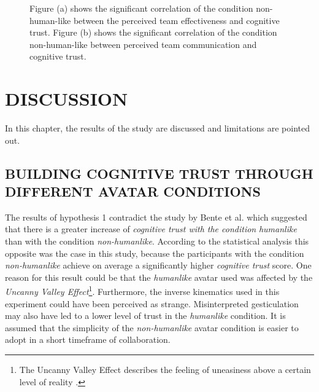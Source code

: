 \documentclass[sigchi]{acmart}
\begin{document}
\begin{figure}[]
  \centering
  \qquad
  \caption[Significant correlations Cognitive trust, Team effectiveness and Team communication]{Figure (a) shows the significant correlation of the condition non-human-like between the perceived team effectiveness and cognitive trust. Figure (b) shows the significant correlation of the condition non-human-like between perceived team communication and cognitive trust. }
  \label{SubDataCorr}
\end{figure}

\section{DISCUSSION}
In this chapter, the results of the study are discussed and limitations are pointed out.

\subsection{BUILDING COGNITIVE TRUST THROUGH DIFFERENT AVATAR CONDITIONS}
The results of hypothesis 1 contradict the study by Bente et al. \cite{bente2004social} which suggested that there is a greater increase of \textit{cognitive trust with the condition} \textit{humanlike} than with the condition \textit{non-humanlike}. According to the statistical analysis this opposite was the case in this study, because the participants with the condition \textit{non-humanlike} achieve on average a significantly higher \textit{cognitive trust} score.
One reason for this result could be that the \textit{humanlike} avatar used was affected by the \textit{Uncanny Valley Effect}\footnote{The Uncanny Valley Effect describes the feeling of uneasiness above a certain level of reality \citep[pp. 352-353]{guest2011uncanny}.}.
Furthermore, the inverse kinematics used in this experiment could have been perceived as strange. Misinterpreted gesticulation may also have led to a lower level of trust in the \textit{humanlike} condition. It is assumed that the simplicity of the \textit{non-humanlike} avatar condition is easier to adopt in a short timeframe of collaboration.
\end{document}
